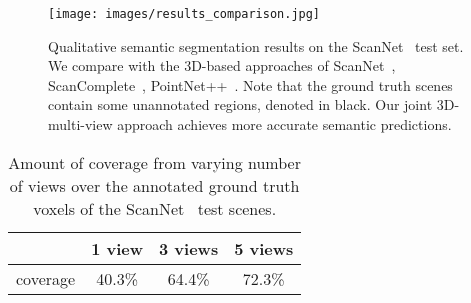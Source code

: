 \begin{comment}
Comparison ScanNet \cite{dai2017scannet}
- ScanNet \cite{dai2017scannet}
- SceneComplete \cite{dai2018scancomplete}
- PointNet++ \cite{qi2017pointnet++}
- Ours

Ablation study on ScanNet
- original ScanNet (only 3D)							- better ScanNet (only 3D but with better features)		- better ScanNet (+ color)								- only 2D projections to 3D (single view)		
- 2D projections but no 3D geometry input	
- 3D + 1 view (best choice of ours)
- 3D + 3 views (best choice of ours)
- 3D + 5 views (best choice of ours)
- 3D + many views at test (best choice of ours)

Ablation study end-to-end vs fixed 2D network
- 3D + 1 view (fixed 2D ENet)		- 3D + 3 views (fixed 2D ENet)		- 3D + 1 view (end-to-end 2D ENet)
- 3D + 3 views (end-to-end 2D ENet)


Ablation study where to join 2D with 3D network
- beginning (1 view)	- middle (1 view)		- end (1 view)			
Ablation study how to train multi view
- 3D + 5 views (trained on 5 views)
- 3D + 5 views (trained on 3 views)
- 3D + 5 views (trained on random views 1-5)
- 3D + 10+ views (trained on 5 views or random views 1-5)
\end{comment}





\begin{figure}[t!] \centering
	\texttt{[image: images/results\_comparison.jpg]}
	\caption{Qualitative semantic segmentation results on the ScanNet~\cite{dai2017scannet} test set. We compare with the 3D-based approaches of ScanNet~\cite{dai2017scannet}, ScanComplete~\cite{dai2018scancomplete}, PointNet++~\cite{qi2017pointnet++}. Note that the ground truth scenes contain some unannotated regions, denoted in black. Our joint 3D-multi-view approach achieves more accurate semantic predictions.
		\vspace{-0.4cm}}
	\label{fig:comparison_scannet}
\end{figure} 

\begin{table*}[!htb]
		\centering
		\begin{tabular}{|c|c|c|c|}
			\hline
			 & 1 view & 3 views & 5 views \\ \hline
			coverage & 40.3\% & 64.4\% & 72.3\% \\ \hline
		\end{tabular}
	\caption{Amount of coverage from varying number of views over the annotated ground truth voxels of the ScanNet~\cite{dai2017scannet} test scenes.
		\vspace{-0.4cm}}
	\label{table:coverage}
\end{table*}

